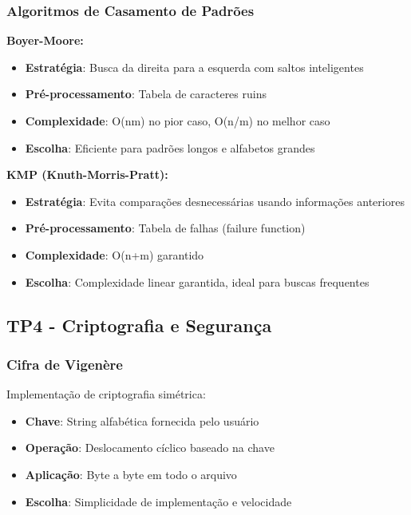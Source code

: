 \documentclass[12pt,a4paper]{article}
\let\oldsubsection\subsection
\renewcommand{\subsection}[1]{\needspace{3\baselineskip}\oldsubsection{#1}}
\begin{document}
\subsubsection{Algoritmos de Casamento de Padrões}

\textbf{Boyer-Moore:}
\begin{itemize}
    \item \textbf{Estratégia}: Busca da direita para a esquerda com saltos inteligentes
    \item \textbf{Pré-processamento}: Tabela de caracteres ruins
    \item \textbf{Complexidade}: O(nm) no pior caso, O(n/m) no melhor caso
    \item \textbf{Escolha}: Eficiente para padrões longos e alfabetos grandes
\end{itemize}

\textbf{KMP (Knuth-Morris-Pratt):}
\begin{itemize}
    \item \textbf{Estratégia}: Evita comparações desnecessárias usando informações anteriores
    \item \textbf{Pré-processamento}: Tabela de falhas (failure function)
    \item \textbf{Complexidade}: O(n+m) garantido
    \item \textbf{Escolha}: Complexidade linear garantida, ideal para buscas frequentes
\end{itemize}

\subsection{TP4 - Criptografia e Segurança}

\subsubsection{Cifra de Vigenère}

Implementação de criptografia simétrica:
\begin{itemize}
    \item \textbf{Chave}: String alfabética fornecida pelo usuário
    \item \textbf{Operação}: Deslocamento cíclico baseado na chave
    \item \textbf{Aplicação}: Byte a byte em todo o arquivo
    \item \textbf{Escolha}: Simplicidade de implementação e velocidade
\end{itemize}
\end{document}
